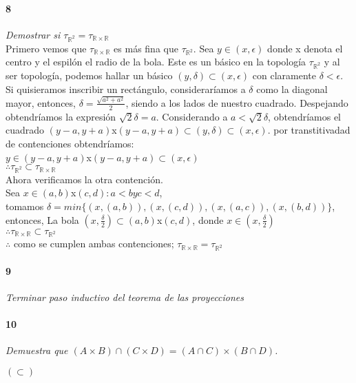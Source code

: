 \documentclass[12pt]{article}
\begin{document}
\paragraph{8}
\textit{Demostrar si $\tau_{\mathbb{R}^2}=\tau_{\mathbb{R} \times \mathbb{R}}$}
\\Primero vemos que \(\tau_{\mathbb{R} \times \mathbb{R}}\)  es más fina que \( \tau_{\mathbb{R}^2}\).
Sea \(y\in(x,\epsilon)\) donde x denota el centro y el espilón el radio de la bola. Este es un básico en la topología \( \tau_{\mathbb{R}^2}\) y al ser topología, podemos hallar un básico \((y,\delta)\subset(x,\epsilon)\) con claramente \(\delta<\epsilon\).
\\Si quisieramos inscribir un rectángulo, consideraríamos a \(\delta\) como la diagonal mayor, entonces, \(\delta=\frac{\sqrt{a^2+a^2}}{2}\), siendo a los lados de nuestro cuadrado. Despejando obtendríamos la expresión \(\sqrt{2}\delta=a\). Considerando a \(a<\sqrt{2}\delta\), obtendríamos el cuadrado \((y-a,y+a)\)x\((y-a,y+a)\subset(y,\delta)\subset(x,\epsilon)\). por transtitivadad de contenciones obtendríamos:
\\\(y\in(y-a,y+a)\)x\((y-a,y+a)\subset(x,\epsilon)\)
\\\(\therefore\tau_{\mathbb{R}^2}\subset\tau_{\mathbb{R} \times \mathbb{R}}\)
\\Ahora verificamos la otra contención.
\\Sea \(x\in(a,b)\)x\((c,d): a<b y c<d\),
\\tomamos \(\delta=min\{(x,(a,b)),(x,(c,d)),(x,(a,c)),(x,(b,d))\}\), entonces, La bola \((x,\frac{\delta}{2})\subset(a,b)\)x\((c,d)\), donde \(x\in(x,\frac{\delta}{2})\)
\\\(\therefore\tau_{\mathbb{R} \times \mathbb{R}}\subset\tau_{\mathbb{R}^2}\)
\\\(\therefore\) como se cumplen ambas contenciones; \(\tau_{\mathbb{R} \times \mathbb{R}}=\tau_{\mathbb{R}^2}\)

\paragraph{9}
\textit{Terminar paso inductivo del teorema de las proyecciones}

\paragraph{10}
\textit{Demuestra que $(A \times B) \cap (C \times D)= (A \cap C) \times (B \cap D)$.}

$(\subset)$
\end{document}
